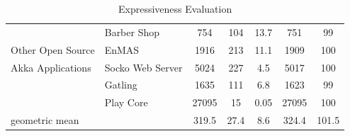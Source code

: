 \begin{table}
\begin{tabular}{| p{4.5 cm} | p{5.6 cm} | c | c |  c | c | c |}
               & Barber Shop \citep{BarberShop}& 754 & 104 & 13.7 & 751 & 99 \\
\cline{2-7}
Other Open Source    & EnMAS \citep{EnMAS} & 1916 & 213 & 11.1 & 1909 & 100 \\
\cline{2-7}
Akka Applications    & Socko Web Server \citep{SOCKO}  & 5024 & 227 & 4.5 & 
5017 & 100 \\
\cline{2-7}
                     & Gatling \citep{Gatling} & 1635 & 111 & 6.8 & 1623 & 99 \\
\cline{2-7}
              & Play Core \citep{play_doc} & 27095 & 15 & 0.05 & 27095 & 100 \\
\hline
geometric mean                   & & 319.5 & 27.4 & 8.6 & 324.4 & 101.5 \\
\hline
\end{tabular}
\caption{Expressiveness Evaluation}
\label{express}
\end{table}

